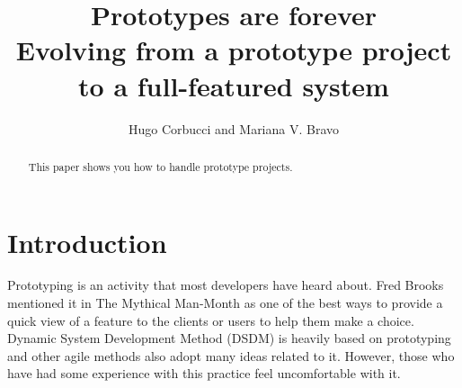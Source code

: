 \documentclass[lnbip]{svmultln}
\begin{document}
%
\mainmatter              %
%
\title{Prototypes are forever\\
  Evolving from a prototype project\\ to a full-featured system}
%
%
\author{Hugo Corbucci and Mariana V. Bravo }
%
%
%

\maketitle              %

\begin{abstract}        %

This paper shows you how to handle prototype projects.

\end{abstract}
%
\section{Introduction}

Prototyping is an activity that most developers have heard about. Fred
Brooks mentioned it in The Mythical Man-Month \cite{Brooks1975} as one
of the best ways to provide a quick view of a feature to the clients
or users to help them make a choice. Dynamic System Development Method
(DSDM)\cite{DSDM} is heavily based on prototyping and other agile
methods also adopt many ideas related to it. However, those who have
had some experience with this practice feel uncomfortable with it.
\end{document}
